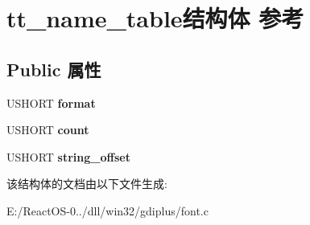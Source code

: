 \hypertarget{structtt__name__table}{}\section{tt\+\_\+name\+\_\+table结构体 参考}
\label{structtt__name__table}
\subsection*{Public 属性}
\begin{DoxyCompactItemize}
\item 
\mbox{\label{structtt__name__table_aabcbe82c125649929f90ca5f0ca1a5a6}} 
U\+S\+H\+O\+RT {\bfseries format}
\item 
\mbox{\label{structtt__name__table_a3184eaa7cefea835c869467648612b4d}} 
U\+S\+H\+O\+RT {\bfseries count}
\item 
\mbox{\label{structtt__name__table_a28f6e5efe3cd2f74e79ca9a5b6814de7}} 
U\+S\+H\+O\+RT {\bfseries string\+\_\+offset}
\end{DoxyCompactItemize}


该结构体的文档由以下文件生成\+:\begin{DoxyCompactItemize}
\item 
E\+:/\+React\+O\+S-\/0../dll/win32/gdiplus/font.\+c\end{DoxyCompactItemize}
